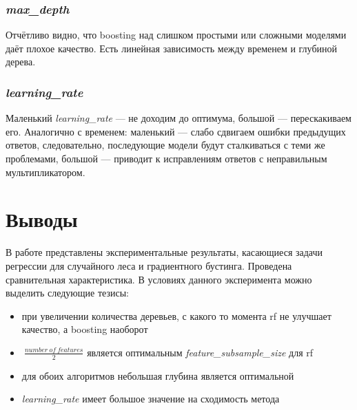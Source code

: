 \documentclass[12pt,fleqn]{article}
\begin{document}
\subsubsection{\emph{max\_depth}}
\begin{figure}[h]
    \centering
\end{figure}

Отчётливо видно, что boosting над слишком простыми или сложными моделями даёт плохое качество. Есть линейная зависимость между временем и глубиной дерева. 
\newpage

\subsubsection{\emph{learning\_rate}}
\begin{figure}[h]
    \centering
\end{figure}

Маленький \emph{learning\_rate} --- не доходим до оптимума, большой --- перескакиваем его. Аналогично с временем: маленький --- слабо сдвигаем ошибки предыдущих ответов, следовательно, последующие модели будут сталкиваться с теми же проблемами, большой --- приводит к исправлениям ответов с неправильным мультипликатором. 


\section{Выводы}
В работе представлены экспериментальные результаты, касающиеся задачи регрессии для случайного леса и градиентного бустинга. Проведена сравнительная характеристика. В условиях данного эксперимента можно выделить следующие тезисы:
\begin{itemize}[noitemsep]
    \item при увеличении количества деревьев, с какого то момента rf не улучшает качество, а boosting наоборот
    \item $~\frac{number\ of\ features}{2}$ является оптимальным \emph{feature\_subsample\_size} для rf
    \item для обоих алгоритмов небольшая глубина является оптимальной 
    \item \emph{learning\_rate} имеет большое значение на сходимость метода  
\end{itemize}
\end{document}
